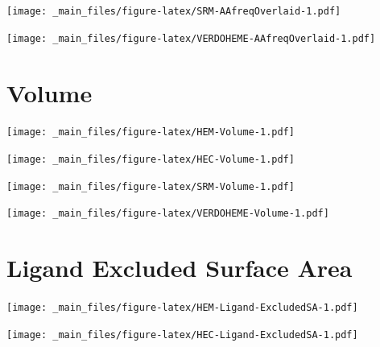 \documentclass[a4paper, nobind]{templates/ociamthesis}
\let\origfigure\figure
\let\endorigfigure\endfigure
\renewenvironment{figure}[1][2] {
    \expandafter\origfigure\expandafter[H]
} {
    \endorigfigure
}
\begin{document}
\begin{figure}
\centering
\texttt{[image: \_main\_files/figure-latex/SRM-AAfreqOverlaid-1.pdf]}
\caption{\label{fig:SRM-AAfreqOverlaid}SRM: AA Frequency}
\end{figure}

\begin{figure}
\centering
\texttt{[image: \_main\_files/figure-latex/VERDOHEME-AAfreqOverlaid-1.pdf]}
\caption{\label{fig:VERDOHEME-AAfreqOverlaid}VERDOHEME: AA Frequency}
\end{figure}

\hypertarget{figs-vol}{%
\section{Volume}\label{figs-vol}}

\begin{figure}
\centering
\texttt{[image: \_main\_files/figure-latex/HEM-Volume-1.pdf]}
\caption{\label{fig:HEM-Volume}HEM: Volume}
\end{figure}

\begin{figure}
\centering
\texttt{[image: \_main\_files/figure-latex/HEC-Volume-1.pdf]}
\caption{\label{fig:HEC-Volume}HEC: Volume}
\end{figure}

\begin{figure}
\centering
\texttt{[image: \_main\_files/figure-latex/SRM-Volume-1.pdf]}
\caption{\label{fig:SRM-Volume}SRM: Volume}
\end{figure}

\begin{figure}
\centering
\texttt{[image: \_main\_files/figure-latex/VERDOHEME-Volume-1.pdf]}
\caption{\label{fig:VERDOHEME-Volume}VERDOHEME: Volume}
\end{figure}

\hypertarget{figs-ligExcSA}{%
\section{Ligand Excluded Surface Area}\label{figs-ligExcSA}}

\begin{figure}
\centering
\texttt{[image: \_main\_files/figure-latex/HEM-Ligand-ExcludedSA-1.pdf]}
\caption{\label{fig:HEM-Ligand-ExcludedSA}HEM: Ligand Excluded Suface Area}
\end{figure}

\begin{figure}
\centering
\texttt{[image: \_main\_files/figure-latex/HEC-Ligand-ExcludedSA-1.pdf]}
\caption{\label{fig:HEC-Ligand-ExcludedSA}HEC: Ligand Excluded Suface Area}
\end{figure}
\end{document}
